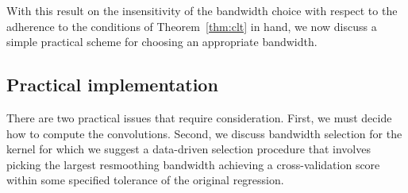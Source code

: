 \documentclass[aos]{imsart}
\newtheorem{remark}{Remark}[section]
\begin{document}
%
%
%
	
	With this result on the insensitivity of the bandwidth choice with respect to the adherence to the conditions of Theorem~\ref{thm:clt} in hand, we now discuss a simple practical scheme for choosing an appropriate bandwidth.
	
	
	\subsection{Practical implementation}
	\label{sect:resmoothimplementation}
	
	There are two practical issues that require consideration. First, we must decide how to compute the convolutions. Second, we discuss bandwidth selection for the kernel for which we suggest a data-driven selection procedure that involves picking the largest resmoothing bandwidth achieving a cross-validation score within some specified tolerance of the original regression.
	
\end{document}
